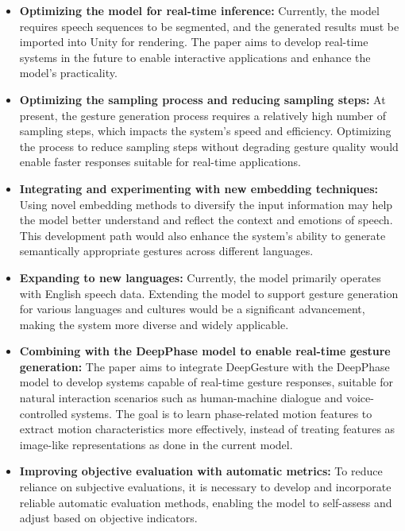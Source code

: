 \begin{itemize}
	\item \textbf{Optimizing the model for real-time inference:} Currently, the model requires speech sequences to be segmented, and the generated results must be imported into Unity for rendering. The paper aims to develop real-time systems in the future to enable interactive applications and enhance the model's practicality.
	
	\item \textbf{Optimizing the sampling process and reducing sampling steps:} At present, the gesture generation process requires a relatively high number of sampling steps, which impacts the system’s speed and efficiency. Optimizing the process to reduce sampling steps without degrading gesture quality would enable faster responses suitable for real-time applications.
	
	\item \textbf{Integrating and experimenting with new embedding techniques:} Using novel embedding methods to diversify the input information may help the model better understand and reflect the context and emotions of speech. This development path would also enhance the system’s ability to generate semantically appropriate gestures across different languages.
	
	\item \textbf{Expanding to new languages:} Currently, the model primarily operates with English speech data. Extending the model to support gesture generation for various languages and cultures would be a significant advancement, making the system more diverse and widely applicable.
	
	\item \textbf{Combining with the DeepPhase model \cite{starke2022deepphase} to enable real-time gesture generation:} The paper aims to integrate DeepGesture with the DeepPhase model to develop systems capable of real-time gesture responses, suitable for natural interaction scenarios such as human-machine dialogue and voice-controlled systems. The goal is to learn phase-related motion features to extract motion characteristics more effectively, instead of treating features as image-like representations as done in the current model.
	
	\item \textbf{Improving objective evaluation with automatic metrics:} To reduce reliance on subjective evaluations, it is necessary to develop and incorporate reliable automatic evaluation methods, enabling the model to self-assess and adjust based on objective indicators.
\end{itemize}
